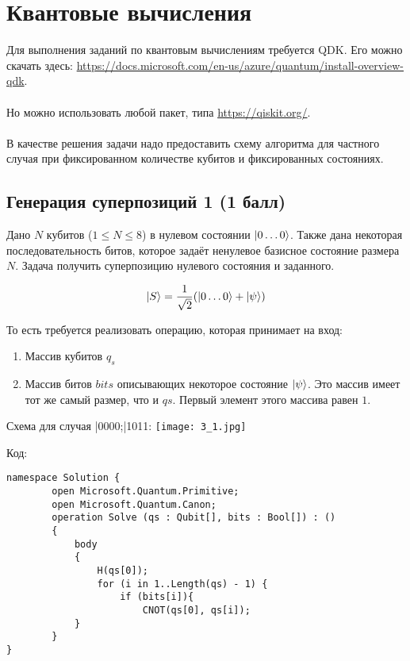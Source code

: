 \documentclass{article}
\begin{document}
\section{Квантовые вычисления}

Для выполнения заданий по квантовым вычислениям требуется QDK. Его можно скачать здесь: \url{https://docs.microsoft.com/en-us/azure/quantum/install-overview-qdk}. 
\\\\
Но можно использовать любой пакет, типа \url{https://qiskit.org/}. 
\\\\
В качестве решения задачи надо предоставить схему алгоритма для частного случая при фиксированном количестве кубитов и фиксированных состояниях. 


\subsection{Генерация суперпозиций 1 (1 балл)}

Дано $N$ кубитов ($1 \le N \le 8$) в нулевом состоянии $\Ket{0\dots0}$. Также дана некоторая последовательность битов, которое задаёт ненулевое базисное состояние размера $N$. Задача получить суперпозицию нулевого состояния и заданного.

$$\Ket{S} = \frac{1}{\sqrt2}(\Ket{0\dots0} +\Ket{\psi})$$

То есть требуется реализовать операцию, которая принимает на вход:

\begin{enumerate}
    \item Массив кубитов $q_s$
    \item Массив битов $bits$ описывающих некоторое состояние $\Ket{\psi}$. Это массив имеет тот же самый размер, что и $qs$. Первый элемент этого массива равен $1$.
\end{enumerate}

    \begin{center}
    Схема для случая |0000\rangle;|1011\rangle: \newline
        \texttt{[image: 3\_1.jpg]}
    \end{center} \newline
Код:\newline
\begin{lstlisting}
namespace Solution {
        open Microsoft.Quantum.Primitive;
        open Microsoft.Quantum.Canon;
        operation Solve (qs : Qubit[], bits : Bool[]) : ()
        {
            body
            {
                H(qs[0]);
                for (i in 1..Length(qs) - 1) {
                    if (bits[i]){
                        CNOT(qs[0], qs[i]);
            }
        }
}
\end{lstlisting}
\end{document}
